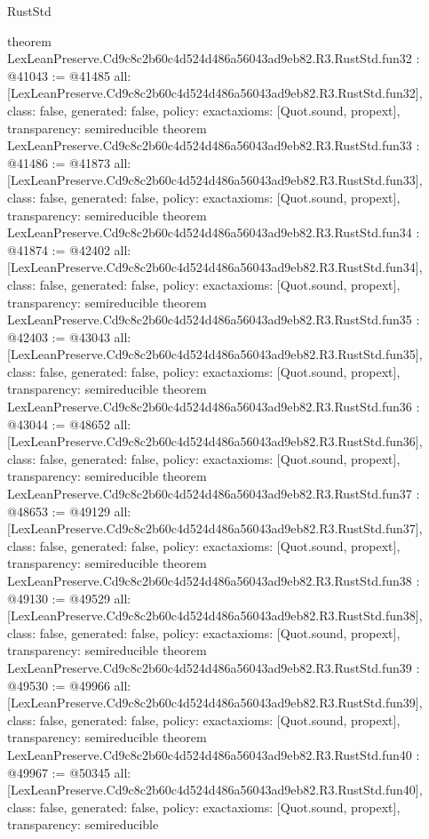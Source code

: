 \begin{lexlean}{RustStd}
\begin{coremodule}
{}
theorem LexLeanPreserve.Cd9c8c2b60c4d524d486a56043ad9eb82.R3.RustStd.fun32 : @41043 := @41485 {
  all: [LexLeanPreserve.Cd9c8c2b60c4d524d486a56043ad9eb82.R3.RustStd.fun32],
  class: false,
  generated: false,
  policy: exact{axioms: [Quot.sound, propext]},
  transparency: semireducible
}
theorem LexLeanPreserve.Cd9c8c2b60c4d524d486a56043ad9eb82.R3.RustStd.fun33 : @41486 := @41873 {
  all: [LexLeanPreserve.Cd9c8c2b60c4d524d486a56043ad9eb82.R3.RustStd.fun33],
  class: false,
  generated: false,
  policy: exact{axioms: [Quot.sound, propext]},
  transparency: semireducible
}
theorem LexLeanPreserve.Cd9c8c2b60c4d524d486a56043ad9eb82.R3.RustStd.fun34 : @41874 := @42402 {
  all: [LexLeanPreserve.Cd9c8c2b60c4d524d486a56043ad9eb82.R3.RustStd.fun34],
  class: false,
  generated: false,
  policy: exact{axioms: [Quot.sound, propext]},
  transparency: semireducible
}
theorem LexLeanPreserve.Cd9c8c2b60c4d524d486a56043ad9eb82.R3.RustStd.fun35 : @42403 := @43043 {
  all: [LexLeanPreserve.Cd9c8c2b60c4d524d486a56043ad9eb82.R3.RustStd.fun35],
  class: false,
  generated: false,
  policy: exact{axioms: [Quot.sound, propext]},
  transparency: semireducible
}
theorem LexLeanPreserve.Cd9c8c2b60c4d524d486a56043ad9eb82.R3.RustStd.fun36 : @43044 := @48652 {
  all: [LexLeanPreserve.Cd9c8c2b60c4d524d486a56043ad9eb82.R3.RustStd.fun36],
  class: false,
  generated: false,
  policy: exact{axioms: [Quot.sound, propext]},
  transparency: semireducible
}
theorem LexLeanPreserve.Cd9c8c2b60c4d524d486a56043ad9eb82.R3.RustStd.fun37 : @48653 := @49129 {
  all: [LexLeanPreserve.Cd9c8c2b60c4d524d486a56043ad9eb82.R3.RustStd.fun37],
  class: false,
  generated: false,
  policy: exact{axioms: [Quot.sound, propext]},
  transparency: semireducible
}
theorem LexLeanPreserve.Cd9c8c2b60c4d524d486a56043ad9eb82.R3.RustStd.fun38 : @49130 := @49529 {
  all: [LexLeanPreserve.Cd9c8c2b60c4d524d486a56043ad9eb82.R3.RustStd.fun38],
  class: false,
  generated: false,
  policy: exact{axioms: [Quot.sound, propext]},
  transparency: semireducible
}
theorem LexLeanPreserve.Cd9c8c2b60c4d524d486a56043ad9eb82.R3.RustStd.fun39 : @49530 := @49966 {
  all: [LexLeanPreserve.Cd9c8c2b60c4d524d486a56043ad9eb82.R3.RustStd.fun39],
  class: false,
  generated: false,
  policy: exact{axioms: [Quot.sound, propext]},
  transparency: semireducible
}
theorem LexLeanPreserve.Cd9c8c2b60c4d524d486a56043ad9eb82.R3.RustStd.fun40 : @49967 := @50345 {
  all: [LexLeanPreserve.Cd9c8c2b60c4d524d486a56043ad9eb82.R3.RustStd.fun40],
  class: false,
  generated: false,
  policy: exact{axioms: [Quot.sound, propext]},
  transparency: semireducible
}
\end{coremodule}
\end{lexlean}
